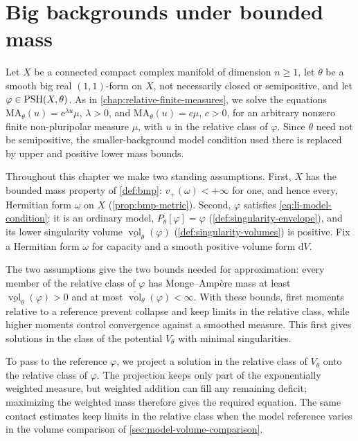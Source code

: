 \chapter{Big backgrounds under bounded mass}
\label{chap:bounded-mass-equations}

\begingroup
{}

Let $X$ be a connected compact complex manifold of dimension $n\geq1$, let $\theta$ be a smooth big real $(1,1)$-form on $X$, not necessarily closed or semipositive, and let $\varphi\in\mathrm{PSH}(X,\theta)$. As in \cref{chap:relative-finite-measures}, we solve the equations $\mathrm{MA}_\theta(u)=\mathrm{e}^{\lambda u}\mu$, $\lambda>0$, and $\mathrm{MA}_\theta(u)=c\mu$, $c>0$, for an arbitrary nonzero finite non-pluripolar measure $\mu$, with $u$ in the relative class of $\varphi$. Since $\theta$ need not be semipositive, the smaller-background model condition used there is replaced by upper and positive lower mass bounds.

Throughout this chapter we make two standing assumptions. First, $X$ has the bounded mass property of \cref{def:bmp}: $v_+(\omega)<+\infty$ for one, and hence every, Hermitian form $\omega$ on $X$ (\cref{prop:bmp-metric}). Second, $\varphi$ satisfies \eqref{eq:li-model-condition}: it is an ordinary model, $P_\theta[\varphi]=\varphi$ (\cref{def:singularity-envelope}), and its lower singularity volume $\underline{\operatorname{vol}}_\theta(\varphi)$ (\cref{def:singularity-volumes}) is positive. Fix a Hermitian form $\omega$ for capacity and a smooth positive volume form $\mathrm{d}V$.

The two assumptions give the two bounds needed for approximation: every member of the relative class of $\varphi$ has Monge--Amp\`ere mass at least $\underline{\operatorname{vol}}_\theta(\varphi)>0$ and at most $\overline{\operatorname{vol}}_\theta(\varphi)<\infty$. With these bounds, first moments relative to a reference prevent collapse and keep limits in the relative class, while higher moments control convergence against a smoothed measure. This first gives solutions in the class of the potential $V_\theta$ with minimal singularities.

To pass to the reference $\varphi$, we project a solution in the relative class of $V_\theta$ onto the relative class of $\varphi$. The projection keeps only part of the exponentially weighted measure, but weighted addition can fill any remaining deficit; maximizing the weighted mass therefore gives the required equation. The same contact estimates keep limits in the relative class when the model reference varies in the volume comparison of \cref{sec:model-volume-comparison}.


